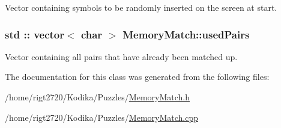 Vector containing symbols to be randomly inserted on the screen at start. 

\hypertarget{classMemoryMatch_a0398b30f4ef488ab7b3e1b10b2ecb75c}{
\subsubsection[{used\-Pairs}]{\setlength{\rightskip}{0pt plus 5cm}std \-:: vector$<$ char $>$ Memory\-Match\-::used\-Pairs\hspace{0.3cm}{\ttfamily [private]}}}\label{classMemoryMatch_a0398b30f4ef488ab7b3e1b10b2ecb75c}


Vector containing all pairs that have already been matched up. 



The documentation for this class was generated from the following files\-:\begin{DoxyCompactItemize}
\item 
/home/rigt2720/\-Kodika/\-Puzzles/\hyperlink{MemoryMatch_8h}{Memory\-Match.\-h}\item 
/home/rigt2720/\-Kodika/\-Puzzles/\hyperlink{MemoryMatch_8cpp}{Memory\-Match.\-cpp}\end{DoxyCompactItemize}
